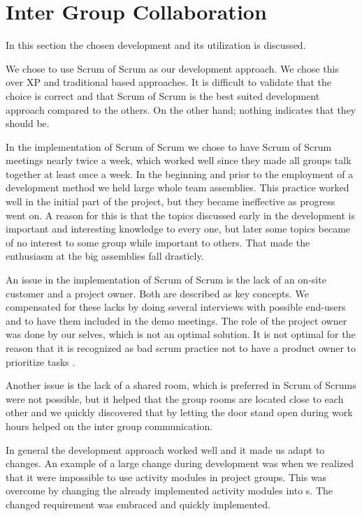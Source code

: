 \section{Inter Group Collaboration}
\label{sec:intergroup}
In this section the chosen development and its utilization is discussed.

We chose to use Scrum of Scrum as our development approach.
We chose this over XP and traditional based approaches.
It is difficult to validate that the choice is correct and that Scrum of Scrum is the best suited development approach compared to the others.
On the other hand; nothing indicates that they should be. 


In the implementation of Scrum of Scrum we chose to have Scrum of Scrum meetings nearly twice a week, which worked well since  they made all groups talk together at least once a week. 
In the beginning and prior to the employment of a development method we held large whole team assemblies. 
This practice worked well in the initial part of the project, but they became ineffective as progress went on. 
A reason for this is that the topics discussed early in the development is important and interesting knowledge to every one, but later some topics became of no interest to some group while important to others.
That made the enthusiasm at the big assemblies fall drasticly. 


An issue in the implementation of Scrum of Scrum is the lack of an on-site customer and a project owner. 
Both are described as key concepts. 
We compensated for these lacks by doing several interviews with possible end-users and to have them included in the demo meetings. 
The role of the project owner was done by our selves, which is not an optimal solution. 
It is not optimal for the reason that it is recognized as bad scrum practice not to have a product owner to prioritize tasks \cite[P. 128]{larman}. 


Another issue is the lack of a shared room, which is preferred in Scrum of Scrums were not possible, but it helped that the group rooms are located close to each other and we quickly discovered that by letting the door stand open during work hours helped on the inter group communication. 

In general the development approach worked well and it made us adapt to changes. 
An example of a large change during development was when we realized that it were impossible to use activity modules in project groups. 
This was overcome by changing the already implemented activity modules into \block[]s. 
The changed requirement was embraced and quickly implemented. 